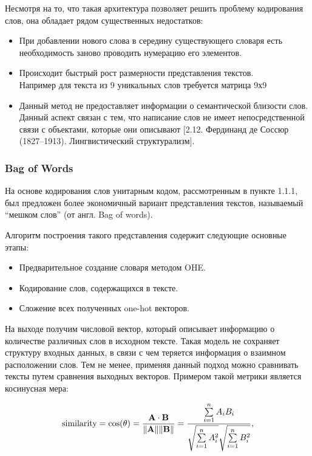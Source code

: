 Несмотря на то, что такая архитектура позволяет решить проблему кодирования слов, она обладает рядом существенных недостатков:
\begin{itemize}
  \item При добавлении нового слова в середину существующего словаря есть необходимость заново проводить нумерацию его элементов.
  \item Происходит быстрый рост размерности представления текстов. \\ Например для текста из 9 уникальных слов требуется матрица 9х9
 \item Данный метод не предоставляет информации о семантической близости слов. Данный аспект связан с тем, что написание слов не имеет непосредственной связи с объектами, которые они описывают [2.12. Фердинанд де Соссюр (1827–1913). Лингвистический структурализм].
\end{itemize}

\subsubsection{Bag of Words}
На основе кодирования слов унитарным кодом, рассмотренным в пункте 1.1.1, был предложен более экономичный вариант представления текстов, называемый “мешком слов” (от англ. Bag of words).

Алгоритм построения такого представления содержит следующие основные этапы:
\begin{itemize}
  \item Предварительное создание словаря методом OHE.
  \item Кодирование слов, содержащихся в тексте.
 \item Сложение всех полученных one-hot векторов.
\end{itemize}

На выходе получим числовой вектор, который описывает информацию о количестве различных слов в исходном тексте.
Такая модель не сохраняет структуру входных данных, в связи с чем теряется информация о взаимном расположении слов.
Тем не менее, применяя данный подход можно сравнивать тексты путем сравнения выходных векторов. Примером такой метрики является косинусная мера:

\begin{equation}\label{eq:cos}
{\displaystyle {\text{similarity}}=\cos(\theta )={\mathbf {A} \cdot \mathbf {B}  \over \|\mathbf {A} \|\|\mathbf {B} \|}={\frac {\sum \limits _{i=1}^{n}{A_{i}B_{i}}}{{\sqrt {\sum \limits _{i=1}^{n}{A_{i}^{2}}}}{\sqrt {\sum \limits _{i=1}^{n}{B_{i}^{2}}}}}},}
\end{equation}

